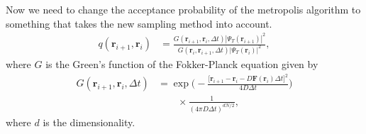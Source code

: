 \documentclass[
    a4paper, aps, twocolumn, floatfix, superscriptaddress, nofootinbib]{revtex4-1}
\newcommand{\vf}{\mathbf}
\newcommand{\1}{\mathds{1}}
\begin{document}
            Now we need to change the acceptance probability of the metropolis
            algorithm to something that takes the new sampling method into
            account.
            \begin{align}
                q(\vf{r}_{i + 1}, \vf{r}_i)
                &=
                \frac{
                    G(\vf{r}_{i + 1}, \vf{r}_{i}, \Delta t)
                    \left|\Psi_T(\vf{r}_{i + 1})\right|^2
                }
                {
                    G(\vf{r}_{i}, \vf{r}_{i + 1}, \Delta t)
                    \left|\Psi_T(\vf{r}_{i})\right|^2
                },
            \end{align}
            where $G$ is the Green's function of the Fokker-Planck equation
            given by
            \begin{align}
                G(\vf{r}_{i + 1}, \vf{r}_i, \Delta t)
                &=
                \exp\Biggl(
                    -\frac{\bigl[
                        \vf{r}_{i + 1}
                        - \vf{r}_{i}
                        - D\vf{F}(\vf{r}_i)\Delta t
                    \bigr]^2}{4D\Delta t}
                \Biggr)
                \nonumber \\
                &\qquad
                \times
                \frac{1}{(4\pi D\Delta t)^{dN/2}},
            \end{align}
            where $d$ is the dimensionality.
\end{document}
